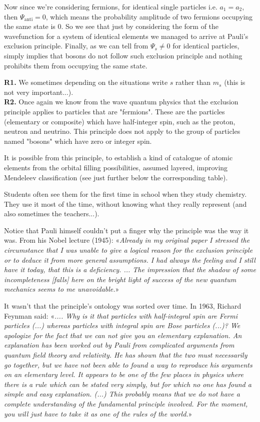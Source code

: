 	Now since we're considering fermions, for identical single particles i.e. $a_{1}=a_{2}$, then $\Psi_{\text{anti}}=0$, which means the probability amplitude of two fermions occupying the same state is $0$. So we see that just by considering the form of the wavefunction for a system of identical elements we managed to arrive at Pauli's exclusion principle. Finally, as we can tell from $\Psi_{s} \neq 0$ for identical particles, simply implies that bosons do not follow such exclusion principle and nothing prohibits them from occupying the same state.
	
	
	\begin{tcolorbox}[title=Remarks,colframe=black,arc=10pt]
	\textbf{R1.} We sometimes depending on the situations write $s$ rather than $m_s$ (this is not very important...).\\
	
	\textbf{R2.} Once again we know from the wave quantum physics that the exclusion principle applies to particles that are "fermions". These are the particles (elementary or composite) which have half-integer spin, such as the proton, neutron and neutrino. This principle does not apply to the group of particles named "bosons" which have zero or integer spin.
	\end{tcolorbox}
	It is possible from this principle, to establish a kind of catalogue of atomic elements from the orbital filling possibilities, assumed layered, improving Mendeleev classification (see just further below the corresponding table).

	Students often see them for the first time in school when they study chemistry. They use it most of the time, without knowing what they really represent (and also sometimes the teachers...).
	
	Notice that Pauli himself couldn't put a finger why the principle was the way it was. From his Nobel lecture (1945): «\textit{Already in my original paper I stressed the circumstance that I was unable to give a logical reason for the exclusion principle or to deduce it from more general assumptions. I had always the feeling and I still have it today, that this is a deficiency. ... The impression that the shadow of some incompleteness [falls] here on the bright light of success of the new quantum mechanics seems to me unavoidable.}»
	
	It wasn't that the principle's ontology was sorted over time. In 1963, Richard Feynman said: «\textit{.... Why is it that particles with half-integral spin are Fermi particles (...) whereas particles with integral spin are Bose particles (...)? We apologize for the fact that we can not give you an elementary explanation. An explanation has been worked out by Pauli from complicated arguments from quantum field theory and relativity. He has shown that the two must necessarily go together, but we have not been able to found a way to reproduce his arguments on an elementary level. It appears to be one of the few places in physics where there is a rule which can be stated very simply, but for which no one has found a simple and easy explanation. (...) This probably means that we do not have a complete understanding of the fundamental principle involved. For the moment, you will just have to take it as one of the rules of the world.}»
	

